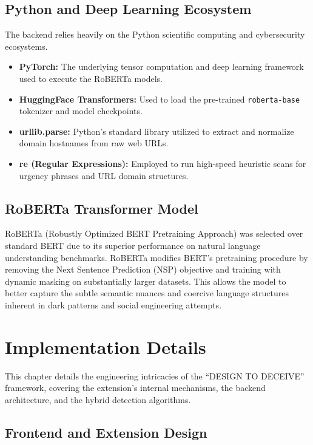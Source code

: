 \section{Python and Deep Learning Ecosystem}
The backend relies heavily on the Python scientific computing and cybersecurity ecosystems.
\begin{itemize}
    \item \textbf{PyTorch:} The underlying tensor computation and deep learning framework used to execute the RoBERTa models.
    \item \textbf{HuggingFace Transformers:} Used to load the pre-trained \texttt{roberta-base} tokenizer and model checkpoints.
    \item \textbf{urllib.parse:} Python's standard library utilized to extract and normalize domain hostnames from raw web URLs.
    \item \textbf{re (Regular Expressions):} Employed to run high-speed heuristic scans for urgency phrases and URL domain structures.
\end{itemize}

\section{RoBERTa Transformer Model}
RoBERTa (Robustly Optimized BERT Pretraining Approach) was selected over standard BERT due to its superior performance on natural language understanding benchmarks. RoBERTa modifies BERT's pretraining procedure by removing the Next Sentence Prediction (NSP) objective and training with dynamic masking on substantially larger datasets. This allows the model to better capture the subtle semantic nuances and coercive language structures inherent in dark patterns and social engineering attempts.


\chapter{Implementation Details}

This chapter details the engineering intricacies of the ``DESIGN TO DECEIVE'' framework, covering the extension's internal mechanisms, the backend architecture, and the hybrid detection algorithms.

\section{Frontend and Extension Design}

